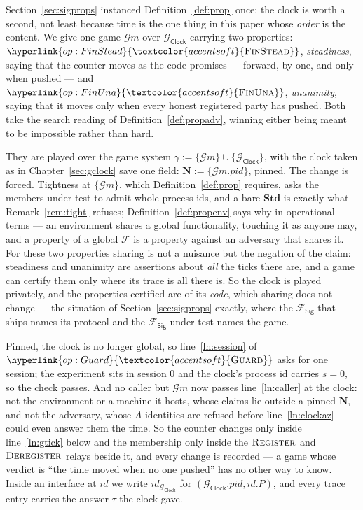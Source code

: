 \documentclass[10pt,oneside,openany]{book}
\newcommand{\PID}{\mathit{pid}}
\newcommand{\admits}{\mathbf{N}}
\newcommand{\Stdpid}{\mathbf{Std}}
\newcommand{\F}{\mathcal{F}}
\newcommand{\op}[1]{\textnormal{\textsc{#1}}}
\newcommand{\opl}[1]{\hyperlink{op:#1}{\textcolor{accentsoft}{\op{#1}}}}
\newcommand{\id}{id}
\newcommand{\Gm}{\mathcal{G}m}
\newcommand{\Fsig}{\mathcal{F}_{\mathsf{Sig}}}
\newcommand{\Gclock}{\mathcal{G}_{\mathsf{Clock}}}
\theoremstyle{accentdef}
\theoremstyle{accentplain}
\begin{document}
Section~\ref{sec:sigprops} instanced Definition~\ref{def:prop} once; the clock is worth a
second, not least because time is the one thing in this paper whose \emph{order} is the content.
We give one game $\Gm$ over $\Gclock$ carrying two properties: $\opl{FinStead}$,
\emph{steadiness}, saying that the counter
moves as the code promises --- forward, by one, and only when pushed --- and $\opl{FinUna}$,
\emph{unanimity}, saying that it moves only when every honest registered party has pushed. Both
take the search reading of Definition~\ref{def:propadv}, winning either being meant to be
impossible rather than hard.

They are played over the game system $\gamma := \{\Gm\} \cup \{\Gclock\}$, with the clock taken
as in Chapter~\ref{sec:gclock} save one field: $\admits := \{\Gm.\PID\}$, pinned. The change is
forced. Tightness at $\{\Gm\}$, which Definition~\ref{def:prop} requires, asks the members under
test to admit whole process ids, and a bare $\Stdpid$ is exactly what Remark~\ref{rem:tight}
refuses; Definition~\ref{def:propenv} says why in operational terms --- an environment shares a
global functionality, touching it as anyone may, and a property of a global $\F$ is a property
against an adversary that shares it. For these two properties sharing is not a nuisance but the
negation of the claim: steadiness and unanimity are assertions about \emph{all} the ticks there
are, and a game can certify them only where its trace is all there is. So the clock is played
privately, and the properties certified are of its \emph{code}, which sharing does not change ---
the situation of Section~\ref{sec:sigprops} exactly, where the $\Fsig$ that ships names its
protocol and the $\Fsig$ under test names the game.

Pinned, the clock is no longer global, so line~\ref{ln:session} of $\opl{Guard}$ asks for one
session; the experiment sits in session $0$ and the clock's process id carries $s = 0$, so the
check passes. And no caller but $\Gm$ now passes line~\ref{ln:caller} at the clock: not the
environment or a machine it hosts, whose claims lie outside a pinned $\admits$, and not the
adversary, whose $A$-identities are refused before line~\ref{ln:clockaz} could even answer them
the time. So the counter changes only inside line~\ref{ln:gtick} below and the membership only
inside the $\op{Register}$ and $\op{Deregister}$ relays beside it, and every change is
recorded --- a game whose verdict is ``the time moved when no one pushed'' has no other way to
know. Inside an interface at $\id$ we write $\id_{\Gclock}$ for $(\Gclock.\PID,\id.P)$, and every
trace entry carries the answer $\tau$ the clock gave.
\end{document}

